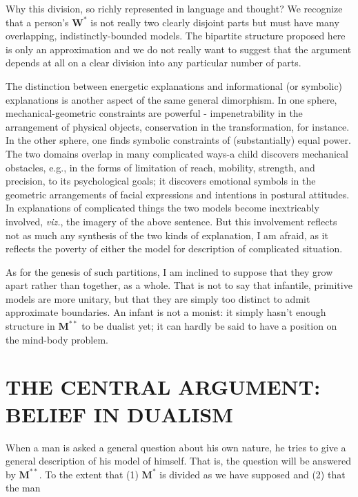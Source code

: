 \documentclass{article}
\begin{document}
Why this division, so richly represented in language and thought? We recognize that a person's $\mathbf{W^\ast}$ is not really two clearly disjoint parts but must have many overlapping, indistinctly-bounded models. The bipartite structure proposed here is only an approximation and we do not really want to suggest that the argument depends at all on a clear division into any particular number of parts.

The distinction between energetic explanations and informational (or symbolic) explanations is another aspect of the same general dimorphism. In one sphere, mechanical-geometric constraints are powerful - impenetrability in the arrangement of physical objects, conservation in the transformation, for instance. In the other sphere, one finds symbolic constraints of (substantially) equal power. The two domains overlap in many complicated ways-a child discovers mechanical obstacles, e.g., in the forms of limitation of reach, mobility, strength, and precision, to its psychological goals; it discovers emotional symbols in the geometric arrangements of facial expressions and intentions in postural attitudes. In explanations of complicated things the two models become inextricably involved, \textit{viz.}, the imagery of the above sentence. But this involvement reflects not as much any synthesis of the two kinds of explanation, I am afraid, as it reflects the poverty of either the model for description of complicated situation.

As for the genesis of such partitions, I am inclined to suppose that they grow apart rather than together, as a whole. That is not to say that infantile, primitive models are more unitary, but that they are simply too distinct to admit approximate boundaries. An infant is not a monist: it simply hasn't enough structure in $\mathbf{M^{\ast\ast}}$ to be dualist yet; it can hardly be said to have a position on the mind-body problem.

\section*{THE CENTRAL ARGUMENT: BELIEF IN DUALISM}

When a man is asked a general question about his own nature, he tries to give a general description of his model of himself. That is, the question will be answered by $\mathbf{M^{\ast\ast}}$. To the extent that (1) $\mathbf{M^\ast}$ is divided as we have supposed and (2) that the man 

\newpage
\end{document}
